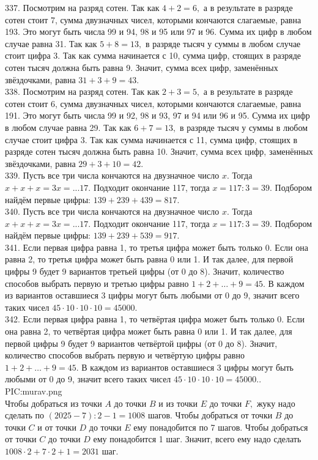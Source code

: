 337. Посмотрим на разряд сотен. Так как $4+2=6,$ а в результате в разряде сотен стоит 7, сумма двузначных чисел, которыми кончаются слагаемые, равна 193. Это могут быть числа 99 и 94, 98 и 95 или 97 и 96. Сумма их цифр в любом случае равна 31. Так как $5+8=13,$ в разряде тысяч у суммы в любом случае стоит цифра 3. Так как сумма начинается с 10, сумма цифр, стоящих в разряде сотен тысяч должна быть равна 9. Значит, сумма всех цифр, заменённых звёздочками, равна $31+3+9=43.$\\
338. Посмотрим на разряд сотен. Так как $2+3=5,$ а в результате в разряде сотен стоит 6, сумма двузначных чисел, которыми кончаются слагаемые, равна 191. Это могут быть числа 99 и 92, 98 и 93, 97 и 94 или 96 и 95. Сумма их цифр в любом случае равна 29. Так как $6+7=13,$ в разряде тысяч у суммы в любом случае стоит цифра 3. Так как сумма начинается с 11, сумма цифр, стоящих в разряде сотен тысяч должна быть равна 10. Значит, сумма всех цифр, заменённых звёздочками, равна $29+3+10=42.$\\
339. Пусть все три числа кончаются на двузначное число $x.$ Тогда $x+x+x=3x=...17.$ Подходит окончание 117, тогда $x=117:3=39.$ Подбором найдём первые цифры: $139+239+439=817.$\\
340. Пусть все три числа кончаются на двузначное число $x.$ Тогда $x+x+x=3x=...17.$ Подходит окончание 117, тогда $x=117:3=39.$ Подбором найдём первые цифры: $139+239+539=917.$\\
341. Если первая цифра равна 1, то третья цифра может быть только 0. Если она равна 2, то третья цифра может быть равна 0 или 1. И так далее, для первой цифры 9 будет 9 вариантов третьей цифры (от 0 до 8). Значит, количество способов выбрать первую и третью цифры равно $1+2+\ldots+9=45.$ В каждом из вариантов оставшиеся 3 цифры могут быть любыми от 0 до 9, значит всего таких чисел $45\cdot10\cdot10\cdot10=45000.$\\
342. Если первая цифра равна 1, то четвёртая цифра может быть только 0. Если она равна 2, то четвёртая цифра может быть равна 0 или 1. И так далее, для первой цифры 9 будет 9 вариантов четвёртой цифры (от 0 до 8). Значит, количество способов выбрать первую и четвёртую цифры равно $1+2+\ldots+9=45.$ В каждом из вариантов оставшиеся 3 цифры могут быть любыми от 0 до 9, значит всего таких чисел $45\cdot10\cdot10\cdot10=45000.$\newpage{}. {{PIC:murav.png}}\\
Чтобы добраться из точки $A$ до точки $B$ и из точки $E$ до точки $F,$ жуку надо сделать по $(2025-7):2-1=1008$ шагов. Чтобы добраться от точки $B$ до точки $C$ и от точки $D$ до точки $E$ ему понадобится по 7 шагов. Чтобы добраться от точки $C$ до точки $D$ ему понадобится 1 шаг. Значит, всего ему надо сделать $1008\cdot2+7\cdot2+1=2031$ шаг.\\
